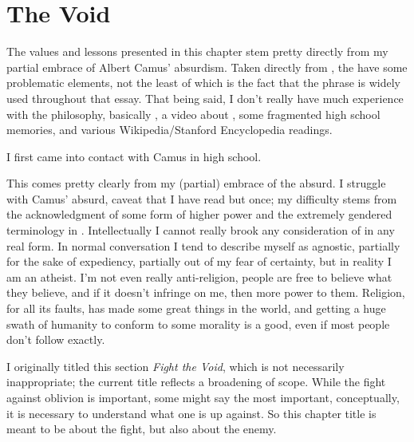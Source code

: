 \documentclass[../butidigress.tex]{subfiles}
\begin{document}
\chapter{The Void}\label{chap:thevoid}
\newpage

The values and lessons presented in this chapter stem pretty directly from my partial embrace of Albert Camus' absurdism.
Taken directly from , the  have some problematic elements, not the least of which is the fact that the phrase  is widely used throughout that essay.
That being said, I don't really have much experience with the philosophy, basically , a video about , some fragmented high school memories, and various Wikipedia/Stanford Encyclopedia readings.

I first came into contact with Camus in high school.


This comes pretty clearly from my (partial) embrace of the absurd.
I struggle with Camus' absurd, caveat that I have read  but once; my difficulty stems from the acknowledgment of some form of higher power and the extremely gendered terminology in .
Intellectually I cannot really brook any consideration of  in any real form.
In normal conversation I tend to describe myself as agnostic, partially for the sake of expediency, partially out of my fear of certainty, but in reality I am an atheist.
I'm not even really anti-religion, people are free to believe what they believe, and if it doesn't infringe on me, then more power to them.
Religion, for all its faults, has made some great things in the world, and getting a huge swath of humanity to conform to some morality is a good, even if most people don't follow exactly.

I originally titled this section \textit{Fight the Void}, which is not necessarily inappropriate; the current title reflects a broadening of scope.
While the fight against oblivion is important, some might say the most important, conceptually, it is necessary to understand what one is up against.
So this chapter title is meant to be about the fight, but also about the enemy.
\end{document}
